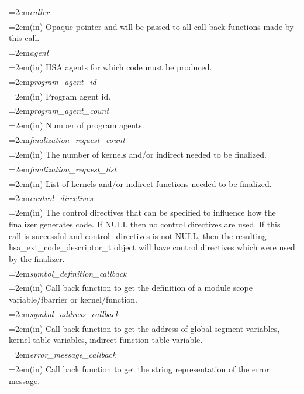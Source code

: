 \documentclass[final]{book}
\newcommand{\hsaarg}[1]{\textit{#1}}
\begin{document}
\noindent\begin{longtable}{@{}>{\hangindent=2em}p{\textwidth}}
\hsaarg{caller}\\\hspace{2em}(in) Opaque pointer and will be passed to all call back functions made by this call.\\[2mm]
\hsaarg{agent}\\\hspace{2em}(in) HSA agents for which code must be produced.\\[2mm]
\hsaarg{program_\-agent_\-id}\\\hspace{2em}(in) Program agent id.\\[2mm]
\hsaarg{program_\-agent_\-count}\\\hspace{2em}(in) Number of program agents.\\[2mm]
\hsaarg{finalization_\-request_\-count}\\\hspace{2em}(in) The number of kernels and/or indirect needed to be finalized.\\[2mm]
\hsaarg{finalization_\-request_\-list}\\\hspace{2em}(in) List of kernels and/or indirect functions needed to be finalized.\\[2mm]
\hsaarg{control_\-directives}\\\hspace{2em}(in) The control directives that can be specified to influence how the finalizer generates code. If NULL then no control directives are used. If this call is successful and control_\-directives is not NULL, then the resulting hsa_\-ext_\-code_\-descriptor_\-t object will have control directives which were used by the finalizer.\\[2mm]
\hsaarg{symbol_\-definition_\-callback}\\\hspace{2em}(in) Call back function to get the definition of a module scope variable/fbarrier or kernel/function.\\[2mm]
\hsaarg{symbol_\-address_\-callback}\\\hspace{2em}(in) Call back function to get the address of global segment variables, kernel table variables, indirect function table variable.\\[2mm]
\hsaarg{error_\-message_\-callback}\\\hspace{2em}(in) Call back function to get the string representation of the error message.\\[2mm]

\end{longtable}
\end{document}
